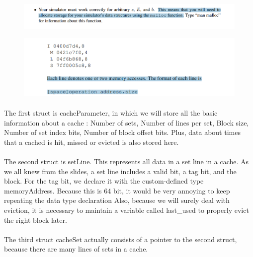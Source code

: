 \documentclass[a4paper]{article}
\begin{document}
\begin{figure}[h!]
  \includegraphics[width=\linewidth]{images/thetruth5.png}
  \caption{}
  \label{}
\end{figure}

\begin{figure}[h!]
  \includegraphics[width=\linewidth]{images/thetruth6.png}
  \caption{}
  \label{}
\end{figure}



\newpage
\paragraph{} 
 The first struct is cacheParameter, in which we will store all the basic information about a cache : Number of sets, Number of lines per set, Block size, Number of set index bits, Number of block offset bits. Plus, data about times that a cached is hit, missed or evicted is also stored here.



\paragraph{} 
The second struct is setLine. This represents all data in a set line in a cache. As we all knew from the slides, a set line includes a valid bit, a tag bit, and the block. For the tag bit, we declare it with the custom-defined type memoryAddress. Because this is 64 bit, it would be very annoying to keep repeating the data type declaration  Also, because we will surely deal with eviction, it is necessary to maintain a variable called last\_used to properly evict the right block later. 

\paragraph{} 
 The third struct cacheSet actually consists of a pointer to the second struct, because there are many lines of sets in a cache.  
\end{document}
